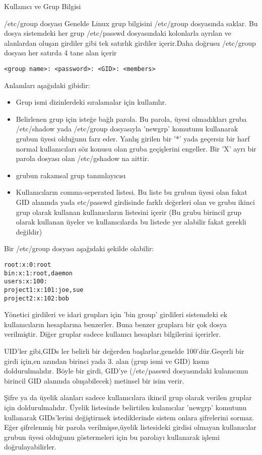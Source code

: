 \begin{section}{Kullanıcı ve Grup Bilgisi}
\begin{subsection}{/etc/group dosyası}
Genelde Linux grup bilgisini /etc/group dosyasında saklar. Bu dosya sistemdeki her grup /etc/passwd dosyasındaki kolonlarla ayrılan ve alanlardan oluşan girdiler gibi tek satırlık girdiler içerir.Daha doğrusu /etc/group dosyası her satırda 4 tane alan içerir
\begin{verbatim}
<group name>: <password>: <GID>: <members>
\end{verbatim}

Anlamları aşağıdaki gibidir:

\begin{itemize}
\item[group name]Grup ismi dizinlerdeki sıralamalar için kullanılır.
\item[password]Belirlenen grup için isteğe bağlı parola. Bu parola, üyesi olmadıkları gruba /etc/shadow yada /etc/group dosyasıyla 'newgrp' komutunu kullanarak grubun üyesi olduğunu farz eder. Yanlış girilen bir '*' yada geçersiz bir harf normal kullanıcıları söz konusu olan gruba geçişlerini engeller. Bir 'X' ayrı bir parola dosyası olan /etc/gshadow na aittir.
\item[GID]grubun rakamsal grup tanımlayıcısı
\item[members]Kullanıcıların comma-seperated listesi. Bu liste bu grubun üyesi olan fakat GID alanında yada etc/passwd girdisinde farklı değerleri olan ve grubu ikinci grup olarak kullanan kullanıcıların listesini içerir (Bu grubu birincil grup olarak kullanan üyeler ve kullanıcılarda bu listede yer alabilir fakat gerekli değildir)
\end{itemize}

Bir /etc/group dosyası aşağıdaki şekilde olabilir:
\begin{verbatim}
root:x:0:root
bin:x:1:root,daemon
users:x:100:
project1:x:101:joe,sue
project2:x:102:bob
\end{verbatim}

Yönetici girdileri ve idari grupları için 'bin group' girdileri sistemdeki ek kullanıcıların hesaplarına benzerler. Buna benzer gruplara bir çok dosya verilmiştir. Diğer gruplar sadece kullanıcı hesapları bilgilerini içerirler.

UID'ler gibi,GIDs ler belirli bir değerden başlarlar,genelde 100'dür.Geçerli bir girdi için,en azından birinci yada 3. alan (grup ismi ve GID) kısmı doldurulmalıdır. Böyle bir girdi, GID'ye (/etc/passwd dosyasındaki kulanıcının birincil GID alanında oluşabilecek) metinsel bir isim verir.

Şifre ya da üyelik alanları sadece kullanıcılara ikincil grup olarak verilen gruplar için doldurulmalıdır. Üyelik listesinde belirtilen kulanıcılar 'newgrp' komutunu kullanarak GIDs'lerini değiştirmek istediklerinde sistem onlara şifrelerini sormaz. Eğer şifrelenmiş bir parola verilmişse,üyelik listesideki girdisi olmayan kullanıcılar grubun üyesi olduğunu göstermeleri için bu parolayı kullanarak işlemi doğrulayabilirler.


\end{subsection}
\end{section}
